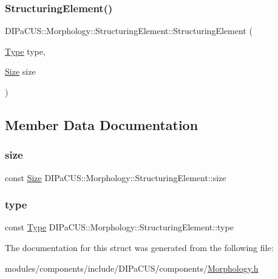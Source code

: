 \subsubsection{\texorpdfstring{Structuring\+Element()}{StructuringElement()}}
{\footnotesize\ttfamily D\+I\+Pa\+C\+U\+S\+::\+Morphology\+::\+Structuring\+Element\+::\+Structuring\+Element (\begin{DoxyParamCaption}\item[{\mbox{\hyperlink{structDIPaCUS_1_1Morphology_1_1StructuringElement_a266d1fadc80f8b6ead0b9a38046db1a9}{Type}}}]{type,  }\item[{\mbox{\hyperlink{structDIPaCUS_1_1Morphology_1_1StructuringElement_ab516593fb61afbb06be48f756af85b56}{Size}}}]{size }\end{DoxyParamCaption})\hspace{0.3cm}{\ttfamily [inline]}}



\subsection{Member Data Documentation}
\mbox{\label{structDIPaCUS_1_1Morphology_1_1StructuringElement_ade1c5c9095630d3f404a75b97f1ae825}} 
\subsubsection{\texorpdfstring{size}{size}}
{\footnotesize\ttfamily const \mbox{\hyperlink{structDIPaCUS_1_1Morphology_1_1StructuringElement_ab516593fb61afbb06be48f756af85b56}{Size}} D\+I\+Pa\+C\+U\+S\+::\+Morphology\+::\+Structuring\+Element\+::size}

\mbox{\label{structDIPaCUS_1_1Morphology_1_1StructuringElement_aea9961571fdde31c048b2b1bd59f296a}} 
\subsubsection{\texorpdfstring{type}{type}}
{\footnotesize\ttfamily const \mbox{\hyperlink{structDIPaCUS_1_1Morphology_1_1StructuringElement_a266d1fadc80f8b6ead0b9a38046db1a9}{Type}} D\+I\+Pa\+C\+U\+S\+::\+Morphology\+::\+Structuring\+Element\+::type}



The documentation for this struct was generated from the following file\+:\begin{DoxyCompactItemize}
\item 
modules/components/include/\+D\+I\+Pa\+C\+U\+S/components/\mbox{\hyperlink{Morphology_8h}{Morphology.\+h}}\end{DoxyCompactItemize}
